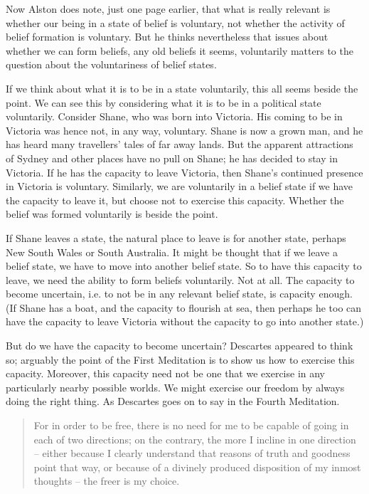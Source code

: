\noindent Now Alston does note, just one page earlier, that what is really relevant is whether our being in a state of belief is voluntary, not whether the activity of belief formation is voluntary. But he thinks nevertheless that issues about whether we can form beliefs, any old beliefs it seems, voluntarily matters to the question about the voluntariness of belief states.

If we think about what it is to be in a state voluntarily, this all seems beside the point. We can see this by considering what it is to be in a political state voluntarily. Consider Shane, who was born into Victoria. His coming to be in Victoria was hence not, in any way, voluntary. Shane is now a grown man, and he has heard many travellers' tales of far away lands. But the apparent attractions of Sydney and other places have no pull on Shane; he has decided to stay in Victoria. If he has the capacity to leave Victoria, then Shane's continued presence in Victoria is voluntary. Similarly, we are voluntarily in a belief state if we have the capacity to leave it, but choose not to exercise this capacity. Whether the belief was formed voluntarily is beside the point.

If Shane leaves a state, the natural place to leave is for another state, perhaps New South Wales or South Australia. It might be thought that if we leave a belief state, we have to move into another belief state. So to have this capacity to leave, we need the ability to form beliefs voluntarily. Not at all. The capacity to become uncertain, i.e. to not be in any relevant belief state, is capacity enough. (If Shane has a boat, and the capacity to flourish at sea, then perhaps he too can have the capacity to leave Victoria without the capacity to go into another state.)

But do we have the capacity to become uncertain? Descartes appeared to think so; arguably the point of the First Meditation is to show us how to exercise this capacity. Moreover, this capacity need not be one that we exercise in any particularly nearby possible worlds. We might exercise our freedom by always doing the right thing. As Descartes goes on to say in the Fourth Meditation.

\begin{quote}
For in order to be free, there is no need for me to be capable of going in each of two directions; on the contrary, the more I incline in one direction -- either because I clearly understand that reasons of truth and goodness point that way, or because of a divinely produced disposition of my inmost thoughts -- the freer is my choice. \cite[40]{DescartesMeditations}
\end{quote}

